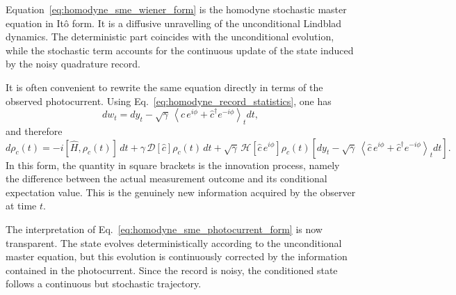 Equation~\eqref{eq:homodyne_sme_wiener_form} is the homodyne stochastic master equation in Itô form. It is a diffusive unravelling of the unconditional Lindblad dynamics. The deterministic part coincides with the unconditional evolution, while the stochastic term accounts for the continuous update of the state induced by the noisy quadrature record.

It is often convenient to rewrite the same equation directly in terms of the observed photocurrent. Using Eq.~\eqref{eq:homodyne_record_statistics}, one has
\begin{equation}
	dw_t
	=
	dy_t
	-
	\sqrt{\gamma}\,
	\left\langle
	\hat c\,e^{i\phi}+\hat c^\dagger e^{-i\phi}
	\right\rangle_t dt,
	\label{eq:homodyne_innovation_process}
\end{equation}
and therefore
\begin{equation}
	d\rho_c(t)
	=
	-i[\hat H,\rho_c(t)]\,dt
	+
	\gamma\,\mathcal{D}[\hat c]\rho_c(t)\,dt
	+
	\sqrt{\gamma}\,
	\mathcal{H}\!\left[\hat c\,e^{i\phi}\right]\rho_c(t)
	\left[
	dy_t
	-
	\sqrt{\gamma}\,
	\left\langle
	\hat c\,e^{i\phi}+\hat c^\dagger e^{-i\phi}
	\right\rangle_t dt
	\right].
	\label{eq:homodyne_sme_photocurrent_form}
\end{equation}
In this form, the quantity in square brackets is the innovation process, namely the difference between the actual measurement outcome and its conditional expectation value. This is the genuinely new information acquired by the observer at time \(t\).

The interpretation of Eq.~\eqref{eq:homodyne_sme_photocurrent_form} is now transparent. The state evolves deterministically according to the unconditional master equation, but this evolution is continuously corrected by the information contained in the photocurrent. Since the record is noisy, the conditioned state follows a continuous but stochastic trajectory.

